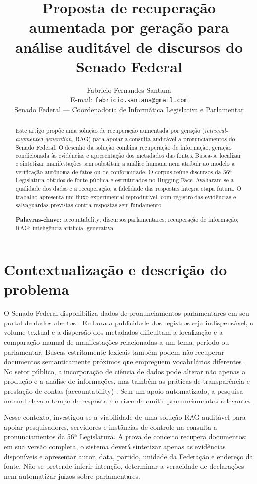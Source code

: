 \documentclass[12pt,a4paper]{article}
\title{Proposta de recuperação aumentada por geração para análise auditável de discursos do Senado Federal}
\author{Fabricio Fernandes Santana\\
  \small E-mail: \texttt{fabricio.santana@gmail.com}\\
  \small Senado Federal --- Coordenadoria de Informática Legislativa e Parlamentar}
\date{}
\begin{document}
\maketitle

\begin{abstract}
Este artigo propõe uma solução de recuperação aumentada por geração
(\textit{retrieval-augmented generation}, RAG) para apoiar a consulta auditável
a pronunciamentos do Senado Federal. O desenho da solução combina recuperação
de informação, geração condicionada às evidências e apresentação dos metadados
das fontes. Busca-se localizar e sintetizar manifestações sem substituir a
análise humana nem atribuir ao modelo a verificação autônoma de fatos ou de
conformidade. O corpus reúne discursos da 56ª Legislatura obtidos de fonte
pública e estruturados no Hugging Face. Avaliaram-se a qualidade dos dados e a
recuperação; a fidelidade das respostas integra etapa futura. O trabalho
apresenta um fluxo experimental reprodutível, com registro das evidências e
salvaguardas previstas contra respostas sem fundamento.

\noindent\textbf{Palavras-chave:} accountability; discursos parlamentares;
recuperação de informação; RAG; inteligência artificial generativa.
\end{abstract}

\section{Contextualização e descrição do problema}

O Senado Federal disponibiliza dados de pronunciamentos parlamentares em seu
portal de dados abertos \cite{senadoDadosAbertos}. Embora a publicidade dos
registros seja indispensável, o volume textual e a dispersão dos metadados
dificultam a localização e a comparação manual de manifestações relacionadas a
um tema, período ou parlamentar. Buscas estritamente lexicais também podem não
recuperar documentos semanticamente próximos que empreguem vocabulários
diferentes \cite{manningEtAl2008informationRetrieval}.
No setor público, a incorporação de ciência de dados pode alterar não apenas a
produção e a análise de informações, mas também as práticas de transparência e
prestação de contas (accountability) \cite{agostinoEtAl2025dataScience}. Sem um
apoio automatizado, a pesquisa manual eleva o tempo de resposta e o risco de
omitir pronunciamentos relevantes.

Nesse contexto, investigou-se a viabilidade de uma solução RAG auditável para apoiar
pesquisadores, servidores e instâncias de controle na consulta a pronunciamentos
da 56ª Legislatura. A prova de conceito recupera documentos; em sua versão
completa, o sistema deverá sintetizar apenas as evidências disponíveis e
apresentar autor, data, partido,
unidade da Federação e endereço da fonte. Não se pretende inferir intenção,
determinar a veracidade de declarações nem automatizar juízos sobre parlamentares.
\end{document}
